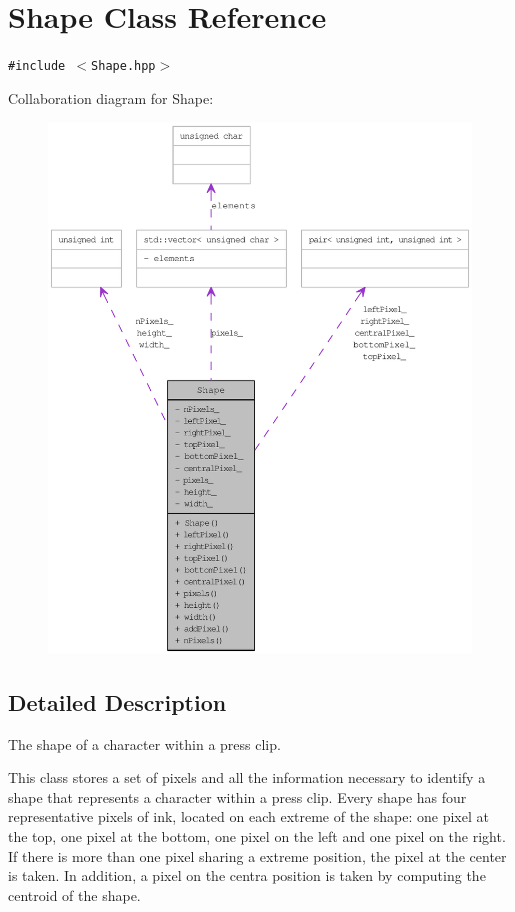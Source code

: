 \hypertarget{class_shape}{
\section{Shape Class Reference}
\label{class_shape}
}
{\tt \#include $<$Shape.hpp$>$}

Collaboration diagram for Shape:\nopagebreak
\begin{figure}[H]
\begin{center}
\leavevmode
\includegraphics[width=400pt]{class_shape__coll__graph}
\end{center}
\end{figure}


\subsection{Detailed Description}
The shape of a character within a press clip. 

This class stores a set of pixels and all the information necessary to identify a shape that represents a character within a press clip. Every shape has four representative pixels of ink, located on each extreme of the shape: one pixel at the top, one pixel at the bottom, one pixel on the left and one pixel on the right. If there is more than one pixel sharing a extreme position, the pixel at the center is taken. In addition, a pixel on the centra position is taken by computing the centroid of the shape.

